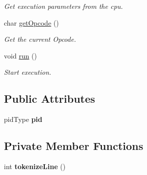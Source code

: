 \begin{DoxyCompactItemize}
\begin{DoxyCompactList}\small\item\em \-Get execution parameters from the cpu. \end{DoxyCompactList}\item 
char \hyperlink{classcCPU_a987e1ab511c71dcde48411f5bb16f9d8}{get\-Opcode} ()
\begin{DoxyCompactList}\small\item\em \-Get the current \-Opcode. \end{DoxyCompactList}\item 
void \hyperlink{classcCPU_aee300d68026ba9f13d5434ff82f0372a}{run} ()
\begin{DoxyCompactList}\small\item\em \-Start execution. \end{DoxyCompactList}\end{DoxyCompactItemize}
\subsection*{\-Public \-Attributes}
\begin{DoxyCompactItemize}
\item 
\hypertarget{classcCPU_abf8b9f3c8e99b0ea03d3051084f57dff}{pid\-Type {\bfseries pid}}\label{d2/dc6/classcCPU_abf8b9f3c8e99b0ea03d3051084f57dff}

\end{DoxyCompactItemize}
\subsection*{\-Private \-Member \-Functions}
\begin{DoxyCompactItemize}
\item 
\hypertarget{classcCPU_a62812ecc1a65c296fb4795b24b451f4e}{int {\bfseries tokenize\-Line} ()}\label{d2/dc6/classcCPU_a62812ecc1a65c296fb4795b24b451f4e}

\end{DoxyCompactItemize}
